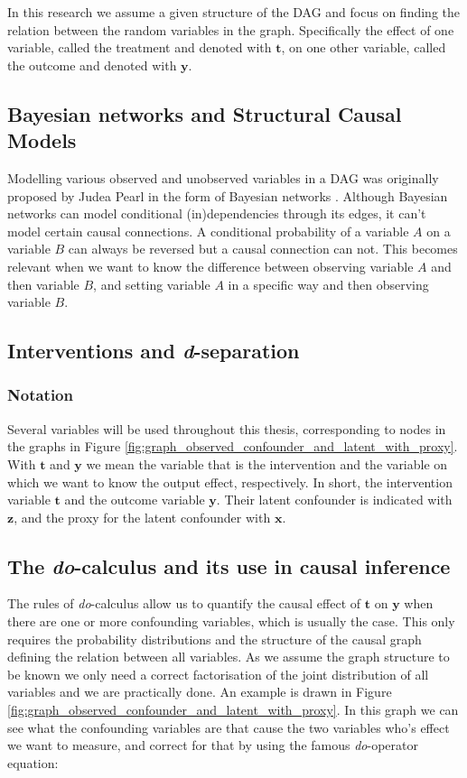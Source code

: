 \documentclass{report}
\newcommand{\bt}{\mathbf{t}}
\newcommand{\bx}{\mathbf{x}}
\newcommand{\by}{\mathbf{y}}
\newcommand{\bz}{\mathbf{z}}
\begin{document}
In this research we assume a given structure of the DAG and focus on finding the relation between the random variables in the graph. Specifically the effect of one variable, called the treatment and denoted with $\bt$, on one other variable, called the outcome and denoted with $\by$. %

\subsection{Bayesian networks and Structural Causal Models}
Modelling various observed and unobserved variables in a DAG was originally proposed by Judea Pearl in the form of Bayesian networks \cite{pearl1985bayesian}. Although Bayesian networks can model conditional (in)dependencies through its edges, it can't model certain causal connections. A conditional probability of a variable $A$ on a variable $B$ can always be reversed but a causal connection can not.
This becomes relevant when we want to know the difference between observing variable $A$ and then variable $B$, and setting variable $A$ in a specific way and then observing variable $B$.

\subsection{Interventions and \textit{d}-separation}

\subsubsection{Notation}
Several variables will be used throughout this thesis, corresponding to nodes in the graphs in Figure \ref{fig:graph_observed_confounder_and_latent_with_proxy}. With $\bt$ and $\by$ we mean the variable that is the intervention and the variable on which we want to know the output effect, respectively. In short, the intervention variable $\bt$ and the outcome variable $\by$. Their latent confounder is indicated with $\bz$, and the proxy for the latent confounder with $\bx$.

\subsection{The \textit{do}-calculus and its use in causal inference}
The rules of \textit{do}-calculus allow us to quantify the causal effect of $\bt$ on $\by$ when there are one or more confounding variables, which is usually the case. This only requires the probability distributions and the structure of the causal graph defining the relation between all variables. As we assume the graph structure to be known we only need a correct factorisation of the joint distribution of all variables and we are practically done. An example is drawn in Figure \ref{fig:graph_observed_confounder_and_latent_with_proxy}. In this graph we can see what the confounding variables are that cause the two variables who's effect we want to measure, and correct for that by using the famous \textit{do}-operator equation:
\end{document}
